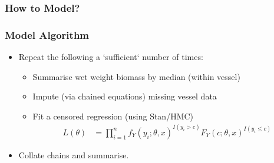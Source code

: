 \documentclass[aspectratio=169]{beamer}
\begin{document}
\begin{frame}
  \frametitle{How to Model?}
\end{frame}

\begin{frame}
  \frametitle{Model Algorithm}
  \begin{itemize}
  \item Repeat the following a `sufficient` number of times:
    \begin{itemize}
    \item Summarise wet weight biomass by median (within vessel)
    \item Impute (via chained equations) missing vessel data
    \item Fit a censored regression (using Stan/HMC)
      \begin{align*}
        L(\theta) & = \prod_{i=1}^{n} f_{Y}(y_{i}; \theta, x)^{I(y_{i} > c)} F_{Y}(c; \theta, x)^{I(y_{i} \leq c)}
      \end{align*}
    \end{itemize}
  \item Collate chains and summarise.
  \end{itemize}
\end{frame}


\end{document}
